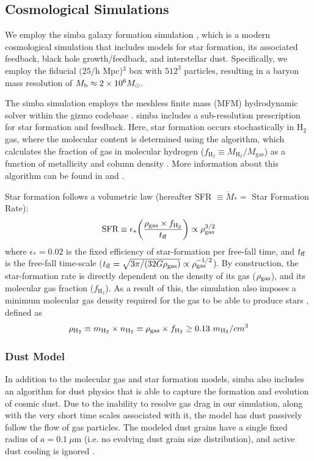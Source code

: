 \documentclass[twocolumn, linenumbers]{aastex631}
\newcommand{\hh}{\text{H}_2}
\newcommand{\fhh}{f_{\text{H}_2}}
\newcommand{\mhh}{M_{\text{H}_2}}
\newcommand{\mgas}{M_{\text{gas}}}
\newcommand{\sfr}{\text{SFR}}
\newcommand{\simba}[0]{{\sc simba} }
\newcommand{\gizmo}[0]{{\sc gizmo} }
\begin{document}
\subsection{Cosmological Simulations}
\label{ssec:simba}

We employ the \simba galaxy formation simulation \citep{simba}, which is a modern cosmological simulation that includes models for star formation, its associated feedback, black hole growth/feedback, and interstellar dust.  Specifically, we employ the fiducial $(25/$h Mpc)$^3$ box with $512^3$ particles, resulting in a baryon mass resolution of $M_{\rm b} \approx 2\times10^6 M_\odot.$   

The \simba simulation employs the meshless finite mass (MFM) hydrodynamic solver within the \gizmo codebase \citep{hopkins15,hopkins17}.  \simba includes a sub-resolution prescription for star formation and feedback.  Here, star formation occurs stochastically in H$_2$ gas, where the molecular content is determined using the \citet*{KMT07} algorithm, which calculates the fraction of gas in molecular hydrogen ($f_{\hh}\equiv \mhh/\mgas$) as a function of metallicity and column density \citep{mufasa}.  More information about this algorithm can be found in \cite{KMT11} and \cite{thompson}.

Star formation follows a volumetric \citet{shmidt} law (hereafter SFR $\equiv\dot{M}_*=$ Star Formation Rate): 
\begin{equation}
\sfr\equiv \epsilon_*\bigg(\frac{\rho_{\rm gas}\times  \fhh}{t_{\rm ff}}\bigg)\propto \rho_{\rm gas}^{3/2}
\label{eq:sfr}
\end{equation}
where $\epsilon_*=0.02$ is the fixed efficiency of star-formation per free-fall time, and $t_{\rm ff}$ is the free-fall time-scale ($t_{\rm ff}=\sqrt{3\pi/(32G\rho_{\rm gas})} \propto \rho_{\rm gas}^{-1/2}$).  By construction, the star-formation rate is directly dependent on the density of its gas ($\rho_{\rm gas}$), and its molecular gas fraction ($\fhh$).  As a result of this, the simulation also imposes a minimum molecular gas density required for the gas to be able to produce stars \citep{mufasa}, defined as
\begin{equation}\rho_{\hh}\equiv m_{\hh}\times n_{\hh}\equiv \rho_{\rm gas}\times f_{\hh}\geq 0.13\ m_{\hh}/cm^3\label{eq:minDen}\end{equation}

\subsubsection{Dust Model}
\label{sssec:dust}
In addition to the molecular gas and star formation models, \simba also includes an algorithm for dust physics that is able to capture the formation and evolution of cosmic dust.  Due to the inability to resolve gas drag in our simulation, along with the very short time scales associated with it, the model has dust passively follow the flow of gas particles. The modeled dust grains have a single fixed radius of $a=0.1~\mu \text{m}$ (i.e. no evolving dust grain size distribution), and active dust cooling is ignored \citep{simba}.
\end{document}
